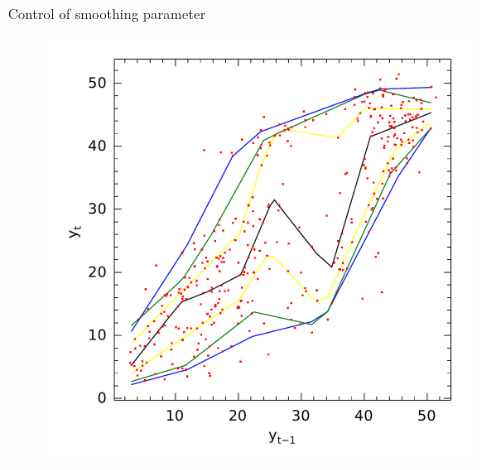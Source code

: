 \documentclass[11pt]{beamer}
\begin{document}
\begin{frame}{Control of smoothing parameter}
\begin{figure}
\begin{minipage}[t]{\linewidth}
\begin{minipage}[t]{0.45\linewidth}
\centering     \includegraphics[width=\textwidth]{../Figuras/npqar/icaraizinho-crossing-3}
\end{minipage}
\end{minipage}
\end{figure}

\end{frame}
\end{document}
